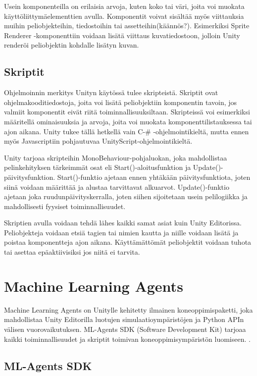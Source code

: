 \documentclass[utf8]{gradu3}
\begin{document}
Usein komponenteilla on erilaisia arvoja, kuten koko tai väri, joita voi muokata käyttöliittymäelementtien avulla. Komponentit voivat sisältää myös viittauksia muihin peliobjekteihin, tiedostoihin tai assetteihin(käännös?). Esimerkiksi Sprite Renderer -komponenttiin voidaan lisätä viittaus kuvatiedostoon, jolloin Unity renderöi peliobjektin kohdalle lisätyn kuvan.

\subsection{Skriptit}

Ohjelmoinnin merkitys Unityn käytössä tulee skripteistä. Skriptit ovat ohjelmakooditiedostoja, joita voi lisätä peliobjektiin komponentin tavoin, jos valmiit komponentit eivät riitä toiminnallisuuksiltaan. Skripteissä voi esimerkiksi määritellä ominaisuuksia ja arvoja, joita voi muokata komponenttilistauksessa tai ajon aikana. Unity tukee tällä hetkellä vain C-\# -ohjelmointikieltä, mutta ennen myös Javascriptiin pohjautuvaa UnityScript-ohjelmointikieltä.

Unity tarjoaa skripteihin MonoBehaviour-pohjaluokan, joka mahdollistaa pelinkehityksen tärkeimmät osat eli Start()-aloitusfunktion ja Update()-päivitysfunktion. Start()-funktio ajetaan ennen yhtäkään päivitysfunktiota, joten siinä voidaan määrittää ja alustaa tarvittavat alkuarvot. Update()-funktio ajetaan joka ruudunpäivityskerralla, joten siihen sijoitetaan usein pelilogiikka ja mahdollisesti fyysiset toiminnallisuudet.

Skriptien avulla voidaan tehdä lähes kaikki samat asiat kuin Unity Editorissa. Peliobjekteja voidaan etsiä tagien tai nimien kautta ja niille voidaan lisätä ja poistaa komponentteja ajon aikana. Käyttämättömät peliobjektit voidaan tuhota tai asettaa epäaktiivisiksi jos niitä ei tarvita.

\section{Machine Learning Agents}

Machine Learning Agents on Unitylle kehitetty ilmainen koneoppimispaketti, joka mahdollistaa Unity Editorilla luotujen simulaatioympäristöjen ja Python APIn välisen vuorovaikutuksen. ML-Agents SDK (Software Development Kit) tarjoaa kaikki toiminnallisuudet ja skriptit toimivan koneoppimisympäristön luomiseen. \parencite{juliani2018unity}.

\subsection{ML-Agents SDK}
\end{document}
